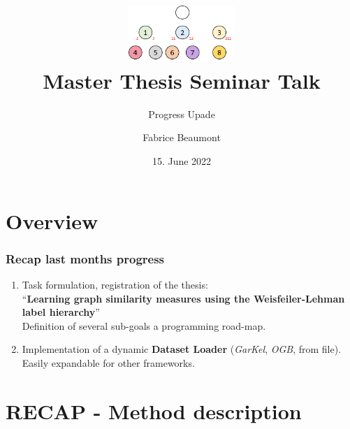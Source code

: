 

\title[MA Seminar Talk - Progress]{
	\centering
	\includegraphics[width=0.3\textwidth]{images/WLLT}\\
	Master Thesis Seminar Talk	
}
\subtitle{Progress Upade}
\author[F. Beaumont]{Fabrice Beaumont}
\date{15. June 2022}

\newcommand{\figureWidth}{7cm}
\newcommand{\figureHorizontal}{2cm}
\newcommand{\figureVertical}{5cm}



\begin{frame}
	\titlepage
\end{frame}

\section{Overview}

\begin{frame}
\frametitle{Recap last months progress} \vspace{-1cm}
	\begin{enumerate}
		\item Task formulation, registration of the thesis:\\
		\enquote{\textbf{Learning graph similarity measures using the Weisfeiler-Lehman label hierarchy}}\\
		Definition of several sub-goals a programming road-map.
		\newline
		\item Implementation of a dynamic \textbf{Dataset Loader} (\textit{GarKel}, \textit{OGB}, from file).\\
		Easily expandable for other frameworks.
	\end{enumerate}
\end{frame}

\section{RECAP - Method description}

